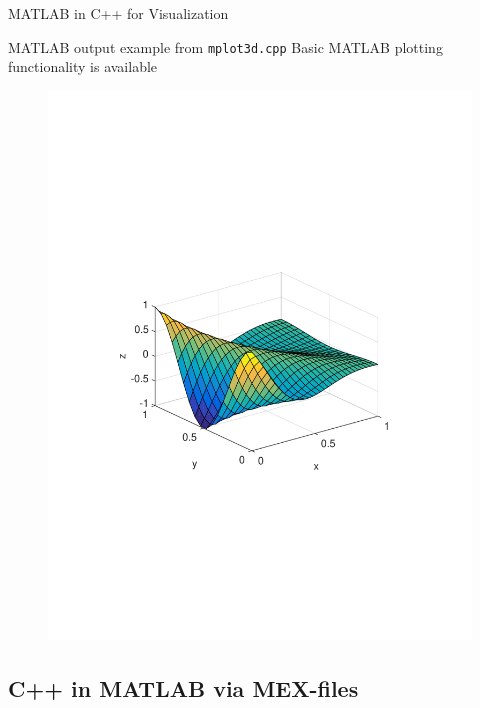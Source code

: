 \documentclass[compress]{beamer}
\begin{document}
\begin{frame}{MATLAB in C++ for Visualization}
	
\begin{exampleblock}{MATLAB output example from \texttt{mplot3d.cpp}}
Basic MATLAB plotting functionality is available
\end{exampleblock}
\begin{figure}
\centering
\includegraphics[width=0.7\linewidth]{figures/3dplot.pdf}
\end{figure}	
	
\end{frame}

\subsection{C++ in MATLAB via MEX-files}
\end{document}
